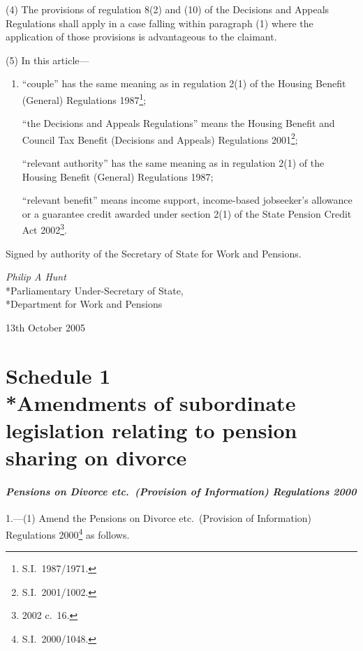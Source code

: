 \documentclass[12pt,a4paper]{article}
\begin{document}
(4) The provisions of regulation 8(2) and (10) of the Decisions and Appeals Regulations shall apply in a case falling within paragraph (1) where the application of those provisions is advantageous to the claimant.

(5) In this article—
\begin{enumerate}\item[]
“couple” has the same meaning as in regulation 2(1) of the Housing Benefit (General) Regulations 1987\footnote{S.I.\ 1987/1971.};

“the Decisions and Appeals Regulations” means the Housing Benefit and Council Tax Benefit (Decisions and Appeals) Regulations 2001\footnote{S.I.\ 2001/1002.};

“relevant authority” has the same meaning as in regulation 2(1) of the Housing Benefit (General) Regulations 1987;

“relevant benefit” means income support, income-based jobseeker’s allowance or a guarantee credit awarded under section 2(1) of the State Pension Credit Act 2002\footnote{2002 c.\ 16.}. 
\end{enumerate}

\bigskip

Signed 
by authority of the 
Secretary of State for Work and Pensions.

{\raggedleft
\emph{Philip A Hunt}\\*Parliamentary Under-Secretary of State,\\*Department for Work and Pensions

}

13th October 2005

\small

\part[Schedule 1 --- Amendments of subordinate legislation relating to pension sharing on divorce]{Schedule 1\\*Amendments of subordinate legislation relating to pension sharing on divorce}

\renewcommand\parthead{--- Schedule 1}

\subsection*{\itshape Pensions on Divorce etc.\ (Provision of Information) Regulations 2000}

1.---(1)  Amend the Pensions on Divorce etc.\ (Provision of Information) Regulations 2000\footnote{S.I.\ 2000/1048.} as follows.
\end{document}

